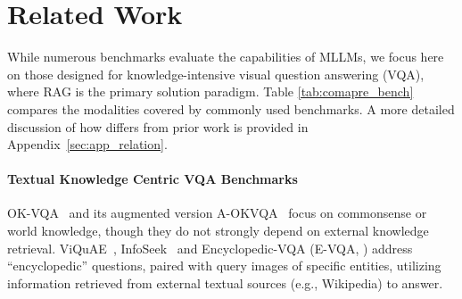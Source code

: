 \section{Related Work}
While numerous benchmarks evaluate the capabilities of MLLMs, we focus here on those designed for knowledge-intensive visual question answering (VQA), where RAG is the primary solution paradigm.  Table \ref{tab:comapre_bench} compares the modalities covered by commonly used benchmarks. A more detailed discussion of how \ds differs from prior work is provided in Appendix~\ref{sec:app_relation}.

\paragraph{Textual Knowledge Centric VQA Benchmarks}
OK-VQA~\citep{Marino_2019_CVPR} and its augmented version A-OKVQA~\citep{10.1007/978-3-031-20074-8_9} focus on commonsense or world knowledge, though they do not strongly depend on external knowledge retrieval. ViQuAE~\citep{10.1145/3477495.3531753}, InfoSeek~\citep{chen-etal-2023-pre-trained} and Encyclopedic-VQA  (E-VQA, \citealp{Mensink_2023_ICCV}) address ``encyclopedic'' questions, paired with query images of specific entities, utilizing information retrieved from external textual sources (e.g., Wikipedia) to answer.



